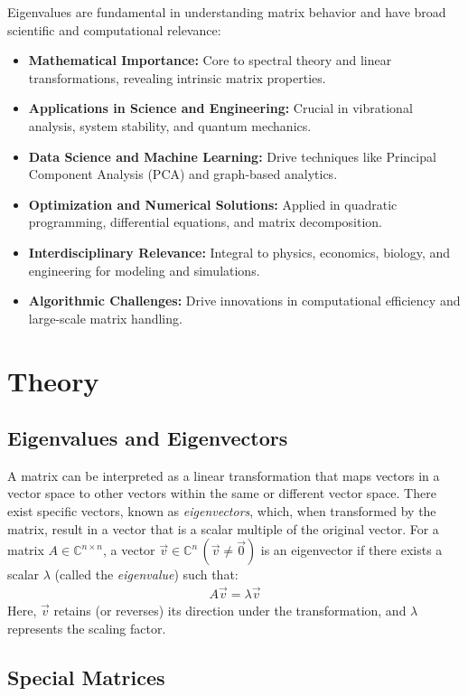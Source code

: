 \documentclass[12pt]{article}
\numberwithin{equation}{subsubsection}
\begin{document}
Eigenvalues are fundamental in understanding matrix behavior and have broad scientific and computational relevance:
\begin{itemize}
	\item \textbf{Mathematical Importance:} Core to spectral theory and linear transformations, revealing intrinsic matrix properties.
	\item \textbf{Applications in Science and Engineering:} Crucial in vibrational analysis, system stability, and quantum mechanics.
	\item \textbf{Data Science and Machine Learning:} Drive techniques like Principal Component Analysis (PCA) and graph-based analytics.
	\item \textbf{Optimization and Numerical Solutions:} Applied in quadratic programming, differential equations, and matrix decomposition.
	\item \textbf{Interdisciplinary Relevance:} Integral to physics, economics, biology, and engineering for modeling and simulations.
	\item \textbf{Algorithmic Challenges:} Drive innovations in computational efficiency and large-scale matrix handling.
\end{itemize}

\section{Theory}

\subsection{Eigenvalues and Eigenvectors}
A matrix can be interpreted as a linear transformation that maps vectors in a vector space to other vectors within the same or different vector space. There exist specific vectors, known as \emph{eigenvectors}, which, when transformed by the matrix, result in a vector that is a scalar multiple of the original vector. For a matrix 
$A\in\mathbb{C}^{n\times n}$, a vector $\vec{v}\in\mathbb{C}^n\,(\vec{v}\neq\vec{0})$ is an eigenvector if there exists a scalar $\lambda$ (called the \emph{eigenvalue}) such that:
\begin{align}
	\label{eq:2.1} A\vec{v} = \lambda\vec{v} 
\end{align}
Here, $\vec{v}$ retains (or reverses) its direction under the transformation, and $\lambda$ represents the scaling factor.

\subsection{Special Matrices}
\end{document}
